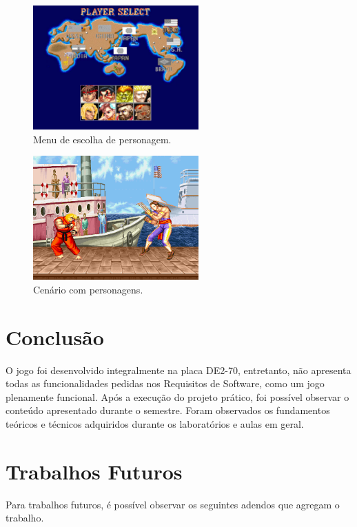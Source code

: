 \documentclass{vgtc}                          %
\begin{document}
\begin{figure}[htbp]
  \centering
  \includegraphics[width=2.5in]{select_vs.png}
 \caption{Menu de escolha de personagem.}
\end{figure}

\begin{figure}[htbp]
  \centering
  \includegraphics[width=2.5in]{ken_battle.png}
 \caption{Cenário com personagens.}
\end{figure}





\section{Conclusão}

O jogo foi desenvolvido integralmente na placa DE2-70, entretanto, não apresenta todas as funcionalidades pedidas nos Requisitos de Software, como um jogo plenamente funcional. Após a execução do projeto prático, foi possível observar o conteúdo apresentado durante o semestre. Foram observados os fundamentos teóricos e técnicos adquiridos durante os laboratórios e aulas em geral.

\section{Trabalhos Futuros}

Para trabalhos futuros, é possível observar os seguintes adendos que agregam o trabalho.
\end{document}
